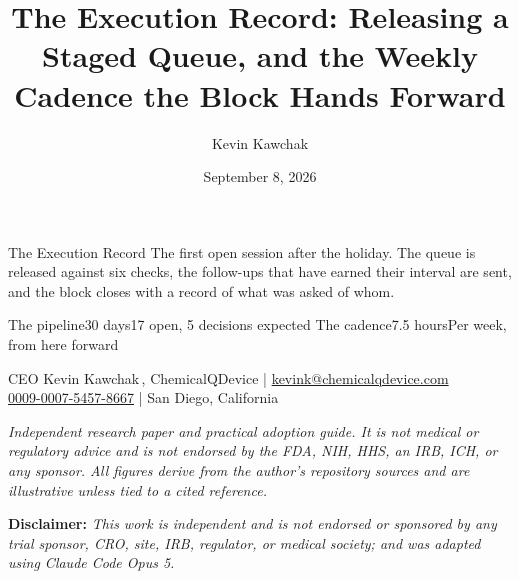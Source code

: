 \documentclass[11pt]{article}
\title{The Execution Record: Releasing a Staged Queue, and the Weekly Cadence
the Block Hands Forward}
\author{Kevin Kawchak}
\date{September 8, 2026}
\begin{document}
\thispagestyle{plain}

%
{The Execution Record}%
{The first open session after the holiday. The queue is released against six
checks, the follow-ups that have earned their interval are sent, and the block
closes with a record of what was asked of whom.}

\vspace{0.15em}

\begin{center}
 \enspace {} \enspace
{} \enspace {} \enspace
{}
\end{center}

\vspace{-0.15em}

%
{The pipeline}{30 days}{17 open, 5 decisions expected}%
{The cadence}{7.5 hours}{Per week, from here forward}

\vspace{-0.1em}
\apprule{0.9pt}

\begin{center}\small
CEO Kevin Kawchak\,, ChemicalQDevice \;|\;
\href{mailto:kevink@chemicalqdevice.com}{kevink@chemicalqdevice.com}\\
\href{https://orcid.org/0009-0007-5457-8667}{0009-0007-5457-8667} \;|\;
San Diego, California
\end{center}

\vspace{-0.25em}
\apprule{0.5pt}

\noindent\footnotesize\textit{Independent research paper and practical adoption
guide. It is not medical or regulatory advice and is not endorsed by the FDA,
NIH, HHS, an IRB, ICH, or any sponsor. All figures derive from the author's
repository sources and are illustrative unless tied to a cited
reference.}\normalsize\par

\vspace{0.12em}

\noindent\footnotesize\textbf{Disclaimer:} \textit{This work is independent and
is not endorsed or sponsored by any trial sponsor, CRO, site, IRB, regulator, or
medical society; and was adapted using Claude Code Opus 5.}\normalsize\par

\vspace{0.12em}
\end{document}
